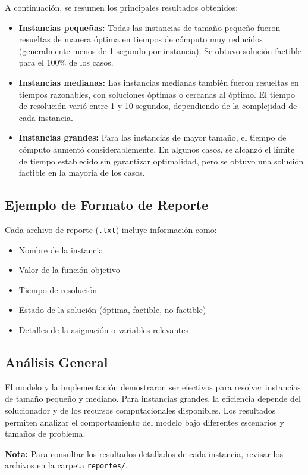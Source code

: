 \documentclass[a4paper,12pt]{article}
\begin{document}
A continuación, se resumen los principales resultados obtenidos:

\begin{itemize}
    \item \textbf{Instancias pequeñas:} Todas las instancias de tamaño pequeño fueron resueltas de manera óptima en tiempos de cómputo muy reducidos (generalmente menos de 1 segundo por instancia). Se obtuvo solución factible para el 100\% de los casos.
    \item \textbf{Instancias medianas:} Las instancias medianas también fueron resueltas en tiempos razonables, con soluciones óptimas o cercanas al óptimo. El tiempo de resolución varió entre 1 y 10 segundos, dependiendo de la complejidad de cada instancia.
    \item \textbf{Instancias grandes:} Para las instancias de mayor tamaño, el tiempo de cómputo aumentó considerablemente. En algunos casos, se alcanzó el límite de tiempo establecido sin garantizar optimalidad, pero se obtuvo una solución factible en la mayoría de los casos.
\end{itemize}

\subsection{Ejemplo de Formato de Reporte}
Cada archivo de reporte (\texttt{.txt}) incluye información como:
\begin{itemize}
    \item Nombre de la instancia
    \item Valor de la función objetivo
    \item Tiempo de resolución
    \item Estado de la solución (óptima, factible, no factible)
    \item Detalles de la asignación o variables relevantes
\end{itemize}

\subsection{Análisis General}
El modelo y la implementación demostraron ser efectivos para resolver instancias de tamaño pequeño y mediano. Para instancias grandes, la eficiencia depende del solucionador y de los recursos computacionales disponibles. Los resultados permiten analizar el comportamiento del modelo bajo diferentes escenarios y tamaños de problema.

\textbf{Nota:} Para consultar los resultados detallados de cada instancia, revisar los archivos en la carpeta \texttt{reportes/}.
\end{document}
